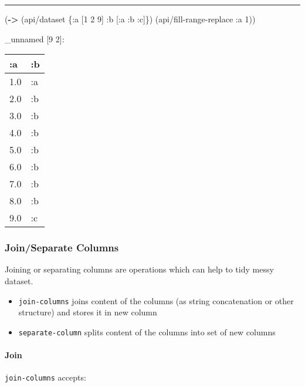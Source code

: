 \documentclass[]{article}
\newenvironment{Shaded}{\begin{snugshade}}{\end{snugshade}}
\newcommand{\AttributeTok}[1]{\textcolor[rgb]{0.77,0.63,0.00}{#1}}
\newcommand{\DecValTok}[1]{\textcolor[rgb]{0.00,0.00,0.81}{#1}}
\newcommand{\KeywordTok}[1]{\textcolor[rgb]{0.13,0.29,0.53}{\textbf{#1}}}
\newcommand{\NormalTok}[1]{#1}
\providecommand{\tightlist}{%
  \setlength{\itemsep}{0pt}\setlength{\parskip}{0pt}}
\let\oldparagraph\paragraph
\renewcommand{\paragraph}[1]{\oldparagraph{#1}\mbox{}}
\begin{document}
\begin{center}\rule{0.5\linewidth}{0.5pt}\end{center}

\begin{Shaded}
\begin{Highlighting}[]
\NormalTok{(}\KeywordTok{->}\NormalTok{ (api/dataset \{}\AttributeTok{:a}\NormalTok{ [}\DecValTok{1} \DecValTok{2} \DecValTok{9}\NormalTok{]}
                  \AttributeTok{:b}\NormalTok{ [}\AttributeTok{:a} \AttributeTok{:b} \AttributeTok{:c}\NormalTok{]\})}
\NormalTok{    (api/fill-range-replace }\AttributeTok{:a} \DecValTok{1}\NormalTok{))}
\end{Highlighting}
\end{Shaded}

\_unnamed {[}9 2{]}:

\begin{longtable}[]{@{}ll@{}}
\toprule
:a & :b\tabularnewline
\midrule
\endhead
1.0 & :a\tabularnewline
2.0 & :b\tabularnewline
3.0 & :b\tabularnewline
4.0 & :b\tabularnewline
5.0 & :b\tabularnewline
6.0 & :b\tabularnewline
7.0 & :b\tabularnewline
8.0 & :b\tabularnewline
9.0 & :c\tabularnewline
\bottomrule
\end{longtable}

\hypertarget{joinseparate-columns}{%
\subsubsection{Join/Separate Columns}\label{joinseparate-columns}}

Joining or separating columns are operations which can help to tidy
messy dataset.

\begin{itemize}
\tightlist
\item
  \texttt{join-columns} joins content of the columns (as string
  concatenation or other structure) and stores it in new column
\item
  \texttt{separate-column} splits content of the columns into set of new
  columns
\end{itemize}

\hypertarget{join}{%
\paragraph{Join}\label{join}}

\texttt{join-columns} accepts:
\end{document}
